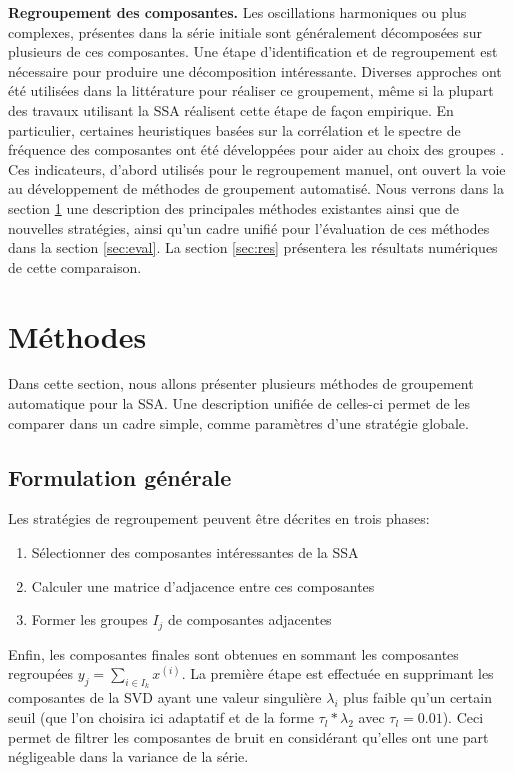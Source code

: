 \documentclass{gretsi}
\begin{document}
\textbf{Regroupement des composantes.}\label{sub:grp}
Les oscillations harmoniques ou plus complexes, présentes dans la série initiale sont généralement décomposées sur plusieurs de ces composantes.
Une étape d'identification et de regroupement est nécessaire pour produire une décomposition intéressante.
Diverses approches ont été utilisées dans la littérature pour réaliser ce groupement, même si la plupart des travaux utilisant la SSA réalisent cette étape de façon empirique.
En particulier, certaines heuristiques basées sur la corrélation et le spectre de fréquence des composantes ont été développées pour aider au choix des groupes \cite{Golyandina_10_ssa}.
Ces indicateurs, d'abord utilisés pour le regroupement manuel, ont ouvert la voie au développement de méthodes de groupement automatisé.
Nous verrons dans la section \ref{sec:met} une description des principales méthodes existantes ainsi que de nouvelles stratégies, ainsi qu'un cadre unifié pour l'évaluation de ces méthodes dans la section \ref{sec:eval}.
La section \ref{sec:res} présentera les résultats numériques de cette comparaison.


\section{Méthodes}
\label{sec:met}

Dans cette section, nous allons présenter plusieurs méthodes de groupement automatique pour la SSA.
Une description unifiée de celles-ci permet de les comparer dans un cadre simple, comme paramètres d'une stratégie globale.

\subsection{Formulation générale}
\label{sub:form}

Les stratégies de regroupement peuvent être décrites en trois phases:
\begin{enumerate}
	\item Sélectionner des composantes intéressantes de la SSA
	\item Calculer une matrice d'adjacence entre ces composantes
	\item Former les groupes $I_j$ de composantes adjacentes
\end{enumerate}
Enfin, les composantes finales sont obtenues en sommant les composantes regroupées $y_j = \sum_{i\in I_k} x^{(i)}$.
La première étape est effectuée en supprimant les composantes de la SVD ayant une valeur singulière $\lambda_i$ plus faible qu'un certain seuil (que l'on choisira ici adaptatif et de la forme  $\tau_l*\lambda_2$ avec $\tau_l = 0.01$).
Ceci permet de filtrer les composantes de bruit en considérant qu'elles ont une part négligeable dans la variance de la série.
\end{document}
